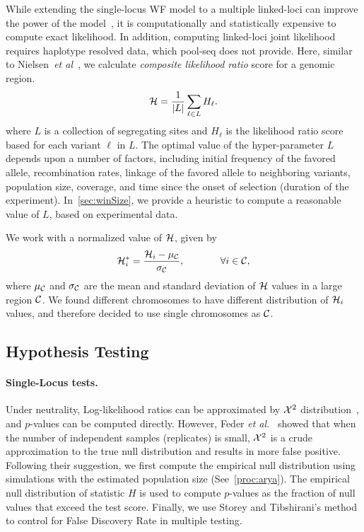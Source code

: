  While extending the single-locus WF model to a multiple linked-loci
 can improve the power of the model~\cite{Terhorst2015Multi}, it is
 computationally and statistically expensive to compute exact
 likelihood. In addition, computing linked-loci joint likelihood requires  
 haplotype resolved data, which pool-seq
 does not provide. Here, similar to Nielsen~\emph{et
   al}~\cite{nielsen2005genomic}, we calculate \emph{composite likelihood
 ratio} score for a genomic region.
\begin{equation}
{\cal H} = \frac{1}{|L|}\sum_{\ell \in L} H_\ell.
\label{eq:pihmm}
\end{equation}
where $L$ is a collection of segregating sites and $H_\ell$ is the
likelihood ratio score based for each variant $\ell$ in $L$.  The
optimal value of the hyper-parameter $L$ depends upon a number of
factors, including initial frequency of the favored allele,
recombination rates, linkage of the favored allele to neighboring
variants, population size, coverage, and time since the onset of
selection (duration of the experiment). In~\ref{sec:winSize}, we
provide a heuristic to compute a reasonable value of $L$, based on
experimental data. 

We work with a normalized value of ${\cal H}$, given by
\begin{equation} {\cal H}_i^*=\frac{{\cal H}_i-\mu_{\cal C}}{\sigma_{\cal C}},
\hspace{0.5in} \forall i \in {\cal C},
\end{equation} 
where $\mu_{\cal C}$ and $\sigma_{\cal C}$ are the mean and standard deviation
of ${\cal H}$ values in a large region ${\cal C}$. We found different
chromosomes to have different distribution of ${\cal H}_i$ values, and
therefore decided to use single chromosomes as ${\cal C}$.
\subsection{Hypothesis Testing}
\paragraph{Single-Locus tests.}
Under neutrality, Log-likelihood ratios can be approximated by ${\cal X}^2$
distribution~\cite{williams2001weighing}, and $p$-values can be
computed directly. However, Feder \emph{et
  al.}~\cite{feder2014Identifying} showed that when the number of
independent samples (replicates) is small, ${\cal X}^2$ is a crude
approximation to the true null distribution and results in more false
positive.  Following their suggestion, we first compute the empirical
null distribution using simulations with the estimated population size
(See~\ref{proc:arya}). The empirical null distribution of statistic
$H$ is used to compute $p$-values as the fraction of null values that
exceed the test score.  Finally, we use Storey and Tibshirani's
method~\cite{storey2003statistical} to control for False Discovery
Rate in multiple testing.


